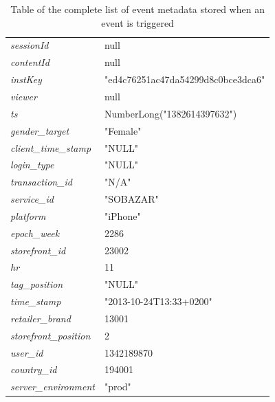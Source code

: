 \begin{table}[H]
{\begin{tabular}{l|l}
              \emph{sessionId} &   null     \\
              \emph{contentId} &   null     \\
              \emph{instKey}   &   "ed4c76251ac47da54299d8c0bce3dca6"   \\
              \emph{viewer}    &   null     \\
              \emph{ts}    &   NumberLong("1382614397632")  \\
              \emph{gender\_target} &   "Female"     \\
              \emph{client\_time\_stamp} &   "NULL"   \\
              \emph{login\_type}    &   "NULL"   \\
              \emph{transaction\_id}    &   "N/A"    \\
              \emph{service\_id}    &   "SOBAZAR"    \\
              \emph{platform}  &   "iPhone"     \\
              \emph{epoch\_week}    &   2286     \\
              \emph{storefront\_id} &   23002    \\
              \emph{hr}    &   11   \\
              \emph{tag\_position}  &   "NULL"   \\
              \emph{time\_stamp}    &   "2013-10-24T13:33+0200"  \\
              \emph{retailer\_brand}    &   13001    \\
              \emph{storefront\_position}   &   2    \\
              \emph{user\_id}   &   1342189870   \\
              \emph{country\_id}    &   194001   \\
              \emph{server\_environment}    &   "prod" \\
              \bottomrule
          \end{tabular}
        }
        \caption[Complete List of Event Metadata]{Table of the complete list of event metadata stored when an event is triggered}
        \label{table:completeEventData}
    \end{table}

